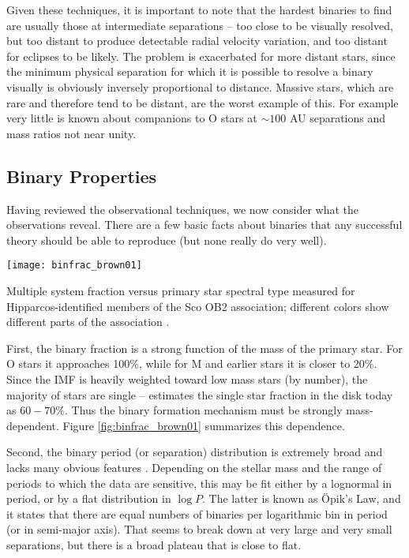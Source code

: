 Given these techniques, it is important to note that the hardest binaries to find are usually those at intermediate separations -- too close to be visually resolved, but too distant to produce detectable radial velocity variation, and too distant for eclipses to be likely. The problem is exacerbated for more distant stars, since the minimum physical separation for which it is possible to resolve a binary visually is obviously inversely proportional to distance. Massive stars, which are rare and therefore tend to be distant, are the worst example of this. For example very little is known about companions to O stars at $\sim 100$ AU separations and mass ratios not near unity.

\subsection{Binary Properties}

Having reviewed the observational techniques, we now consider what the observations reveal. There are a few basic facts about binaries that any successful theory should be able to reproduce (but none really do very well).

\begin{marginfigure}
\texttt{[image: binfrac\_brown01]}
\caption[Multiple system fraction versus primary spectral type]{
\label{fig:binfrac_brown01}
Multiple system fraction versus primary star spectral type measured for Hipparcos-identified members of the Sco OB2 association; different colors show different parts of the association \citep{brown01a}.
}
\end{marginfigure}

First, the binary fraction is a strong function of the mass of the primary star. For O stars it approaches 100\%, while for M and earlier stars it is closer to 20\%. Since the IMF is heavily weighted toward low mass stars (by number), the majority of stars are single -- \citet{lada06a} estimates the single star fraction in the disk today as $60-70\%$. Thus the binary formation mechanism must be strongly mass-dependent. Figure \ref{fig:binfrac_brown01} summarizes this dependence.

Second, the binary period (or separation) distribution is extremely broad and lacks many obvious features \citep{duquennoy91a}. Depending on the stellar mass and the range of periods to which the data are sensitive, this may be fit either by a lognormal in period, or by a flat distribution in $\log P$. The latter is known as \"{O}pik's Law, and it states that there are equal numbers of binaries per logarithmic bin in period (or in semi-major axis). That seems to break down at very large and very small separations, but there is a broad plateau that is close to flat.

